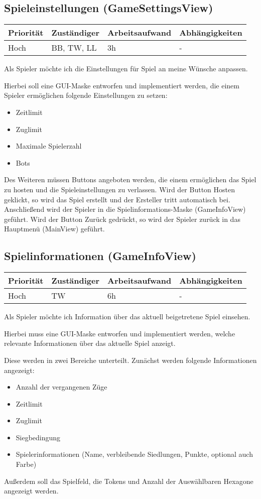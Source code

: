 \documentclass[a4paper]{scrreprt}
\newenvironment{requirement}[5] {
	\subsection{#1}
	\begin{tabularx}{\textwidth}{|X|l|X|X|}
		\hline
		Priorität & Zuständiger & Arbeitsaufwand & Abhängigkeiten \\
		\hline
		#2 & #3 & #4 & #5 \\
		\hline
	\end{tabularx}
	}{
	\newpage
	}
\begin{document}
\begin{requirement}{Spieleinstellungen (GameSettingsView)}{Hoch}{BB, TW, LL}{3h}{-}

\begin{center}
	Als Spieler möchte ich die Einstellungen für Spiel an meine Wünsche anpassen.
\end{center}

Hierbei soll eine GUI-Maske entworfen und implementiert werden, die einem Spieler ermöglichen folgende Einstellungen zu setzen:

\begin{itemize}
	\item Zeitlimit
	\item Zuglimit
	\item Maximale Spielerzahl
	\item Bots
\end{itemize}

Des Weiteren müssen Buttons angeboten werden, die einem ermöglichen das Spiel zu \glqq hosten\grqq{} und die Spieleinstellungen zu verlassen.
Wird der Button \glqq 
Hosten\grqq{} geklickt, so wird das Spiel erstellt und der Ersteller tritt automatisch bei. Anschließend wird der Spieler in die Spielinformations-Maske (\glqq GameInfoView\grqq{}) geführt. Wird der Button \glqq Zurück\grqq{} gedrückt, so wird der Spieler zurück in das Hauptmenü (\glqq MainView\grqq{}) geführt.

\end{requirement}


\begin{requirement}{Spielinformationen (GameInfoView)}{Hoch}{TW}{6h}{-}

\begin{center}
	Als Spieler möchte ich Information über das aktuell beigetretene Spiel einsehen.
\end{center}

Hierbei muss eine GUI-Maske entworfen und implementiert werden, welche relevante Informationen über das aktuelle Spiel anzeigt.

Diese werden in zwei Bereiche unterteilt. Zunächst werden folgende Informationen angezeigt:
\begin{itemize}
	\item Anzahl der vergangenen Züge
	\item Zeitlimit
	\item Zuglimit
	\item Siegbedingung
	\item Spielerinformationen (Name, verbleibende Siedlungen, Punkte, optional auch Farbe)
\end{itemize}

Außerdem soll das Spielfeld, die Tokens und Anzahl der Auswählbaren Hexagone angezeigt werden.

\end{requirement}
\end{document}
